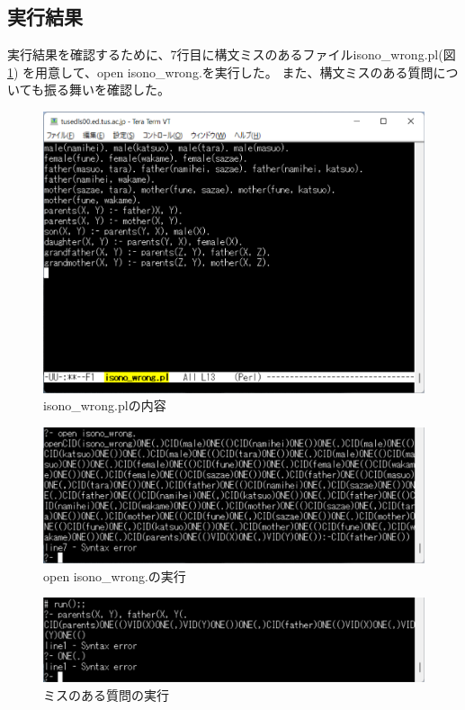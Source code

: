 \documentclass{ltjsarticle}
\begin{document}
\subsection{実行結果}
実行結果を確認するために、7行目に構文ミスのあるファイルisono\_wrong.pl(図\ref{fig:iw})
を用意して、open isono\_wrong.を実行した。
また、構文ミスのある質問についても振る舞いを確認した。
\begin{figure}[htbp]
  \centering
  \caption{isono\_wrong.plの内容}
  \label{fig:iw}
  \includegraphics[scale = 0.6]{isono_wrong.png}
\end{figure}

\begin{figure}[htbp]
  \centering
  \caption{open isono\_wrong.の実行}
  \label{fig:run_wrong}
  \includegraphics[scale = 0.6]{run_isono_wrong.png}
\end{figure}

\begin{figure}[htbp]
  \centering
  \caption{ミスのある質問の実行}
  \label{fig:run_wrong_q}
  \includegraphics[scale = 0.6]{run_wrongcode.png}
\end{figure}
\end{document}
